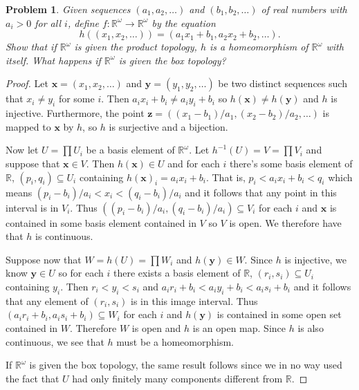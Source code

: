 \documentclass{article}
\newtheorem{problem}{Problem}
\begin{document}
\begin{problem}
\label{homeo}
Given sequences $(a_1, a_2, \dots )$ and $(b_1, b_2, \dots )$ of real numbers with $a_i > 0$ for all $i$, define $f : \mathbb{R}^{\omega} \to \mathbb{R}^{\omega}$ by the equation
\[
h((x_1, x_2, \dots )) = (a_1x_1 + b_1, a_2x_2 + b_2, \dots ).
\]
Show that if $\mathbb{R}^{\omega}$ is given the product topology, $h$ is a homeomorphism of $\mathbb{R}^{\omega}$ with itself. What happens if $\mathbb{R}^{\omega}$ is given the box topology?
\end{problem}
\begin{proof}
Let $\mathbf{x} = (x_1, x_2, \dots )$ and $\mathbf{y} = (y_1, y_2, \dots )$ be two distinct sequences such that $x_i \neq y_i$ for some $i$. Then $a_ix_i + b_i \neq a_iy_i + b_i$ so $h(\mathbf{x}) \neq h(\mathbf{y})$ and $h$ is injective. Furthermore, the point $\mathbf{z} = ((x_1-b_1)/a_1, (x_2-b_2)/a_2, \dots )$ is mapped to $\mathbf{x}$ by $h$, so $h$ is surjective and a bijection.

Now let $U = \prod U_i$ be a basis element of $\mathbb{R}^{\omega}$. Let $h^{-1}(U) = V = \prod V_i$ and suppose that $\mathbf{x} \in V$. Then $h(\mathbf{x}) \in U$ and for each $i$ there's some basis element of $\mathbb{R}$, $(p_i,q_i) \subseteq U_i$ containing $h(\mathbf{x})_i = a_ix_i + b_i$. That is, $p_i < a_ix_i + b_i < q_i$ which means $(p_i-b_i)/a_i < x_i < (q_i-b_i)/a_i$ and it follows that any point in this interval is in $V_i$. Thus $((p_i-b_i)/a_i, (q_i-b_i)/a_i) \subseteq V_i$ for each $i$ and $\mathbf{x}$ is contained in some basis element contained in $V$ so $V$ is open. We therefore have that $h$ is continuous.

Suppose now that $W = h(U) = \prod W_i$ and $h(\mathbf{y}) \in W$. Since $h$ is injective, we know $\mathbf{y} \in U$ so for each $i$ there exists a basis element of $\mathbb{R}$, $(r_i, s_i) \subseteq U_i$ containing $y_i$. Then $r_i < y_i < s_i$ and $a_ir_i+b_i < a_iy_i + b_i < a_is_i + b_i$ and it follows that any element of $(r_i, s_i)$ is in this image interval. Thus $(a_ir_i+b_i, a_is_i+b_i) \subseteq W_i$ for each $i$ and $h(\mathbf{y})$ is contained in some open set contained in $W$. Therefore $W$ is open and $h$ is an open map. Since $h$ is also continuous, we see that $h$ must be a homeomorphism.

If $\mathbb{R}^{\omega}$ is given the box topology, the same result follows since we in no way used the fact that $U$ had only finitely many components different from $\mathbb{R}$.
\end{proof}
\end{document}
